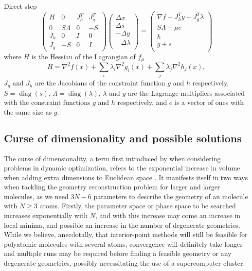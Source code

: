 Direct step
\begin{equation}
\begin{pmatrix}
  H   & 0        & J_h^T & J_g^T \\
  0   & S\Lambda & 0     & -S \\
  J_h & 0        & I     & 0 \\
  J_g & -S       & 0     & I
\end{pmatrix}
\begin{pmatrix}
  \Delta x  \\
  \Delta s  \\
  -\Delta y \\
  -\Delta \lambda \\
\end{pmatrix}
=
\begin{pmatrix}
\nabla f - J_h^T y - J_g^T \lambda  \\
S\Lambda - \mu e \\
h \\
g + s \\
\end{pmatrix}
\end{equation}
where $H$ is the Hessian of the Lagrangian of $f_\mu$
\begin{equation}
H = \nabla^2 f(x) + \sum_i \lambda_i \nabla^2 g_i(x) + \sum_j \lambda_j \nabla^2 h_j(x),
\end{equation}
$J_g$ and $J_h$ are the Jacobians of the constraint function $g$ and $h$ respectively, $S = \operatorname{diag}(s)$, $\Lambda = \operatorname{diag}(\lambda)$, $\lambda$ and $y$ are the Lagrange multipliers associated with the constraint functions $g$ and $h$ respectively, and $e$ is a vector of ones with the same size as $g$.


\subsection{Curse of dimensionality and possible solutions} \label{ssec:curse}
The curse of dimensionality, a term first introduced by \citet{Bellman57} when considering problems in dynamic optimization, refers to the exponential increase in volume when adding extra dimensions to Euclidean space \citep{Keogh10}. It manifests itself in two ways when tackling the geometry reconstruction problem for larger and larger molecules, as we need $3N-6$ parameters to describe the geometry of an molecule with $N \ge 3$ atoms. Firstly, the parameter space or phase space to be searched increases exponentially with $N$, and with this increase may come an increase in local minima, and possible an increase in the number of degenerate geometries. While we believe, anecdotally, that interior-point methods will still be feasible for polyatomic molecules with several atoms, convergence will definitely take longer and multiple runs may be required before finding a feasible geometry or any degenerate geometries, possibly necessitating the use of a supercomputer cluster.

